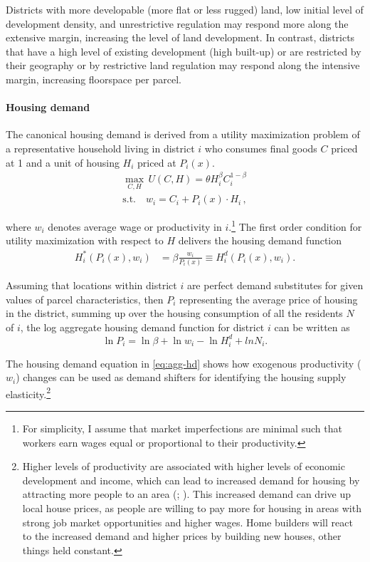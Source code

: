 \documentclass[
  12pt,
]{article}
\begin{document}
Districts with more developable (more flat or less rugged) land, low initial level of development density, and unrestrictive regulation may respond more along the extensive margin, increasing the level of land development. In contrast, districts that have a high level of existing development (high built-up) or are restricted by their geography or by restrictive land regulation may respond along the intensive margin, increasing floorspace per parcel.

\paragraph{Housing demand}\label{housing-demand}

The canonical housing demand is derived from a utility maximization problem of a representative household living in district \(i\) who consumes final goods \(C\) priced at 1 and a unit of housing \(H_i\) priced at \(P_i(x)\).\[\begin{aligned}
\underset{C,H}{\max}\, U(C, H) = \theta H_i^\beta C_i^{1-\beta}\\
\text{s.t.}\quad w_i = C_i+P_i(x)\cdot H_i\,,
\end{aligned}\]

where \(w_i\) denotes average wage or productivity in \(i\).\footnote{For simplicity, I assume that market imperfections are minimal such that workers earn wages equal or proportional to their productivity.} The first order condition for utility maximization with respect to \(H\) delivers the housing demand function \[
\begin{aligned}
H^{*}_i(P_i(x), w_i) &= \beta\frac{w_i}{P_i(x)} \equiv H^d_i(P_i(x), w_i).
\end{aligned}
\]

Assuming that locations within district \(i\) are perfect demand substitutes for given values of parcel characteristics, then \(P_{i}\) representing the average price of housing in the district, summing up over the housing consumption of all the residents \(N\) of \(i\), the log aggregate housing demand function for district \(i\) can be written as \begin{equation}
\ln P_{i}=\ln \beta + \ln w_{i}-\ln H_{i}^{d} + ln N_{i} \label{eq:agg-hd}.
\end{equation}

The housing demand equation in \eqref{eq:agg-hd} shows how exogenous productivity (\(w_i\)) changes can be used as demand shifters for identifying the housing supply elasticity.\footnote{Higher levels of productivity are associated with higher levels of economic development and income, which can lead to increased demand for housing by attracting more people to an area (; ). This increased demand can drive up local house prices, as people are willing to pay more for housing in areas with strong job market opportunities and higher wages. Home builders will react to the increased demand and higher prices by building new houses, other things held constant.}
\end{document}
